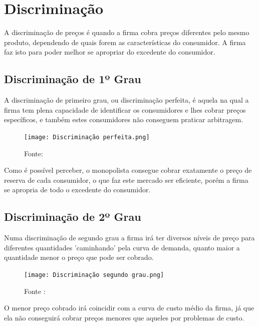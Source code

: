 \documentclass[12pt,a4paper,oneside,brazil]{abntex2}
\begin{document}
\section{Discriminação}
A discriminação de preços é quando a firma cobra preços diferentes pelo mesmo produto, dependendo de quais forem as características do consumidor. A firma faz isto para poder melhor se apropriar do excedente do consumidor.
\subsection{Discriminação de 1º Grau}
A discriminação de primeiro grau, ou discriminação perfeita, é aquela na qual a firma tem plena capacidade de identificar os consumidores e lhes cobrar preços específicos, e também estes consumidores não conseguem praticar arbitragem.

\begin{figure}
	\texttt{[image: Discriminação perfeita.png]}
	\centering
	\caption{Fonte: \cite[p. 514]{nicholson}}
\end{figure}

Como é possível perceber, o monopolista consegue cobrar exatamente o preço de reserva de cada consumidor, o que faz este mercado ser eficiente, porém a firma se apropria de todo o excedente do consumidor.
\clearpage
\subsection{Discriminação de 2º Grau}
Numa discriminação de segundo grau a firma irá ter diversos níveis de preço para diferentes quantidades 'caminhando' pela curva de demanda, quanto maior a quantidade menor o preço que pode ser cobrado.
\begin{figure}[h]
\texttt{[image: Discriminação segundo grau.png]}
\centering
\caption{Fonte : \cite[p. 399]{pindyck}}
\end{figure}
O menor preço cobrado irá coincidir com a curva de custo médio da firma, já que ela não conseguirá cobrar preços menores que aqueles por problemas de custo.
\end{document}
